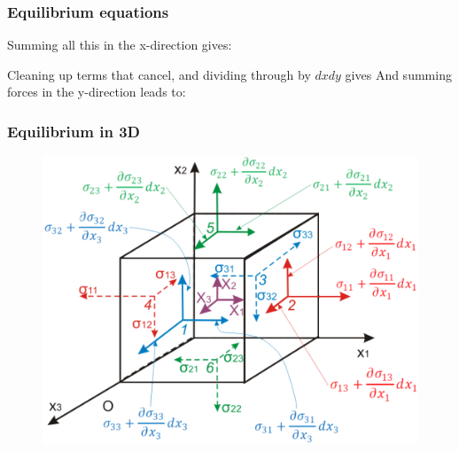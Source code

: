\documentclass[notes]{beamer}
\begin{document}
\begin{frame}
\frametitle{Equilibrium equations}
Summing all this in the x-direction gives:

Cleaning up terms that cancel, and dividing through by \(dx dy\) gives
	And summing forces in the y-direction leads to:
\end{frame}

\begin{frame}
\frametitle{Equilibrium in 3D}
 	\begin{figure}
		\includegraphics[width=0.8\linewidth]{figs/stress-equilibrium.png}
	\end{figure}
\end{frame}
\end{document}
